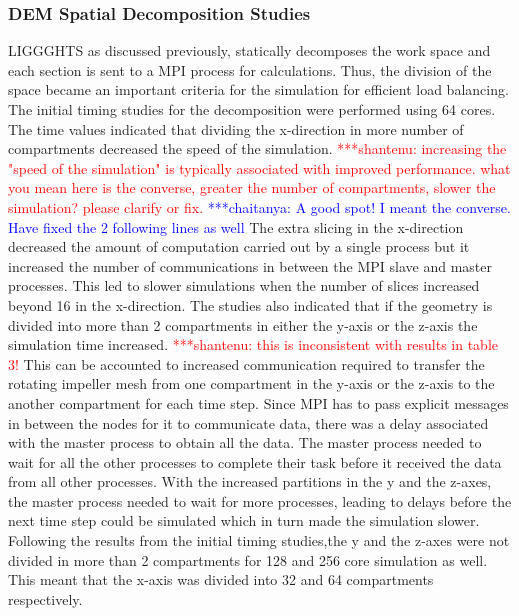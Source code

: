 \documentclass[preprint,11pt,authoryear]{elsarticle}
\newcommand{\jhanote}[1]{ {\textcolor{red} { ***shantenu: #1 }}}
\newcommand{\csnote}[1]{ {\textcolor{blue} { ***chaitanya: #1 }}}
\newcommand{\gpnote}[1]{{\textcolor{green} {***giannis: #1}}}
\newcommand{\jhanote}[1]{}
\newcommand{\csnote}[1]{}
\newcommand{\gpnote}[1]{}
\begin{document}
\subsubsection{DEM Spatial Decomposition Studies}
LIGGGHTS as discussed previously, statically decomposes the work space and
each section is sent to a MPI process for calculations. Thus, the division of
the space became an important criteria for the simulation for efficient load
balancing. The initial timing studies for the decomposition were performed using 64
cores. The time values indicated that dividing the
x-direction in more number of compartments decreased the speed of the simulation. 
\jhanote{increasing the "speed of the simulation" is typically
associated with improved performance. what you mean here is the converse,
greater the number of compartments, slower the simulation? please clarify or
fix.} \csnote{A good spot! I meant the converse. Have fixed the 2 following lines as well} 
The extra slicing in the x-direction decreased the amount of computation carried out by 
a single process but it increased the number of communications in between the MPI slave 
and master processes. This led to slower simulations when the number of slices 
increased beyond 16 in the x-direction. 
The studies also indicated that if the geometry is divided into more than 2 compartments 
in either the y-axis or the z-axis the simulation time increased. 
\jhanote{this is inconsistent with results in table 3!} 
This can be accounted to increased communication required to transfer 
the rotating impeller mesh from one compartment in the y-axis or the z-axis 
to the another compartment for each time step. Since MPI has to pass explicit 
messages in between the nodes for it to communicate data, there was a delay 
associated with the master process to obtain all the data. The master process
needed to wait for all the other processes to complete their task before it received 
the data from all other processes. With the increased 
partitions in the y and the z-axes, the master process needed to wait for more 
processes, leading to delays before the next time step could be simulated which 
in turn made the simulation slower.
Following the results from the initial timing studies,the y and the z-axes were not divided
in more than 2 compartments for 128 and 256 core simulation as well. This
meant that the x-axis was divided into 32 and 64 compartments respectively. 
\end{document}
